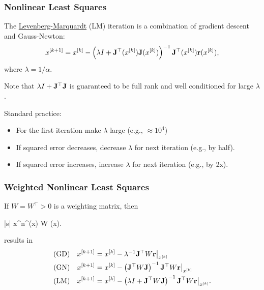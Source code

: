 \documentclass{beamer}
\begin{document}
\begin{frame}\frametitle{Nonlinear Least Squares}
	The \underline{Levenberg-Marquardt} (LM) iteration is a combination of gradient descent and Gauss-Newton:
	\[
		x^{[k+1]} = x^{[k]} - \left(\lambda I + \mathbf{J}^\top(x^{[k]}) \mathbf{J}(x^{[k]})\right)^{-1} \mathbf{J}^\top(x^{[k]}) \mathbf{r}(x^{[k]}),
	\]	
	where $\lambda = 1/\alpha$.  
	
	Note that $\lambda I + \mathbf{J}^\top \mathbf{J}$ is guaranteed to be full rank and well conditioned for large $\lambda$.
	
	Standard practice:
	\begin{itemize}
		\item For the first iteration make $\lambda$ large (e.g., $\approx 10^4$)
		\item If squared error decreases, decrease $\lambda$ for next iteration (e.g., by half).
		\item If squared error increases, increase $\lambda$ for next iteration (e.g., by 2x).
	\end{itemize}
\end{frame}

\begin{frame}\frametitle{Weighted Nonlinear Least Squares}
	If $W=W^\top >0$ is a weighting matrix, then 
	\begin{mini*}|s|
		{x\in{}^n}{\rbf^\top(x) W \rbf(x)}{}{}.
	\end{mini*}
	results in
	\begin{align*}
		\text{(GD)} &\quad 	x^{[k+1]} = x^{[k]} - \lambda^{-1} \mathbf{J}^\top W \mathbf{r}\big|_{x^{[k]}} \\
		\text{(GN)} &\quad 	x^{[k+1]} = x^{[k]} - \left(\mathbf{J}^\top W \mathbf{J}\right)^{-1} \mathbf{J}^\top W \mathbf{r}\big|_{x^{[k]}} \\
		\text{(LM)} &\quad 	x^{[k+1]} = x^{[k]} - \left(\lambda I + \mathbf{J}^\top W \mathbf{J}\right)^{-1} \mathbf{J}^\top W \mathbf{r}\big|_{x^{[k]}}.		
	\end{align*}
\end{frame}
\end{document}
